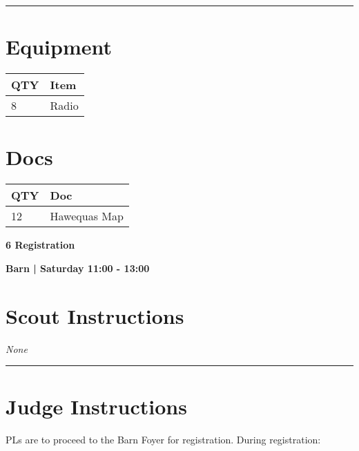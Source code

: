 \documentclass[10pt]{article}
\newcommand{\newtitle}[1]{\begin{center}{\Huge\bfseries #1 }\\ \vspace{5mm}\end{center}}
\newcommand{\newsubtitle}[1]{\begin{center}{\color{grey}\Large\bfseries #1 }\\ \vspace{5mm}\end{center}}
\begin{document}
			\vspace{0.5cm}
	\hrule
	\vspace{0.5cm}

	\begin{multicols}{2}

		\section*{\faWrench \: Equipment}

		
	\begin{center}
			\begin{tabular}{p{2cm}p{4cm}}


				\textbf{QTY} & \textbf{Item} \\\toprule
												8&Radio\\\midrule
								\end{tabular}

			\end{center}

		
		\vfill\null
		\columnbreak

			\section*{\faFile \: Docs}
		 	\begin{center}
			\begin{tabular}{p{2cm}p{4cm}}

			\textbf{QTY} & \textbf{Doc} \\\toprule
										12&Hawequas Map\\\midrule
							\end{tabular}
			\end{center}
	

		\vfill\null

		\end{multicols}



	\vspace{1cm}


	\clearpage
		\newtitle{6 Registration }
	\newsubtitle{Barn | Saturday 11:00 - 13:00}
		\setcounter{section}{5}
	\section*{Scout Instructions}
		\textit{None}
	
	\vspace{0.5cm}
	\hrule
	\vspace{0.5cm}

		\section*{Judge Instructions}
		PLs are to proceed to the Barn Foyer for registration. During registration:
\end{document}
